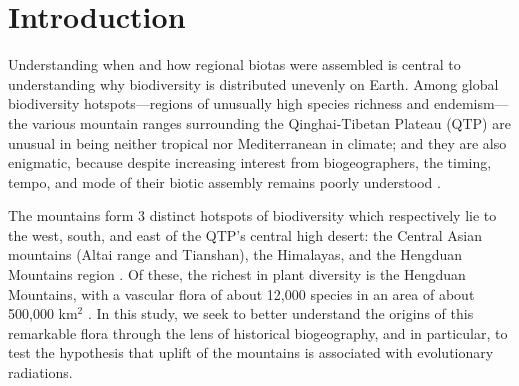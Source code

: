 \section{Introduction}


Understanding when and how regional biotas were assembled is central to understanding why biodiversity is distributed unevenly on Earth. Among global biodiversity hotspots---regions of unusually high species richness and endemism---the various mountain ranges surrounding the Qinghai-Tibetan Plateau (QTP) are unusual in being neither tropical nor Mediterranean in climate; and they are also enigmatic, because despite increasing interest from biogeographers, the timing, tempo, and mode of their biotic assembly remains poorly understood \citep{Favre2014,Wen2014}.

The mountains form 3 distinct hotspots of biodiversity which respectively lie to the west, south, and east of the QTP's central high desert: the Central Asian mountains (Altai range and Tianshan), the Himalayas, and the Hengduan Mountains region \citep{Favre2014}. Of these, the richest in plant diversity is the Hengduan Mountains, with a vascular flora of about 12,000 species in an area of about 500,000 km$^2$ \citep{Boufford2014,LiEtLi1993,Wu1988}. In this study, we seek to better understand the origins of this remarkable flora through the lens of historical biogeography, and in particular, to test the hypothesis that uplift of the mountains is associated with evolutionary radiations.


